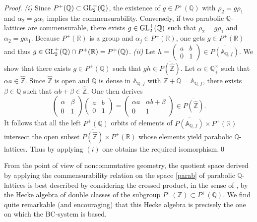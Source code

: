 \documentclass[graybox, envcountsect%
]{svmult}
\def\GL{{\rm GL}}
\def\A{{\mathbb A}}
\def\Q{{\mathbb Q}}
\def\R{{\mathbb R}}
\def\Z{{\mathbb Z}}
\begin{document}
\begin{proof} {\it (i)} Since $ P^+(\Q)\subset \GL_2^+(\Q)$, the existence of $g\in P^+(\Q)$ with $\rho_2=g\rho_1$ and $\alpha_2=g\alpha_1$ implies the commensurability. Conversely, if  two parabolic $\Q$-lattices are commensurable, there exists $g\in \GL_2^+(\Q)$ such that $\rho_2=g\rho_1$ and $\alpha_2=g\alpha_1$.	 Because $P^+(\R)$ is a group and $\alpha_j\in P^+(\R)$, one gets   
$g\in P^+(\R)$ and thus $g\in \GL_2^+(\Q)\cap P^+(\R)=P^+(\Q)$. \newline
{\it (ii)} Let $h=\begin{pmatrix} a &b \\
0 &1 \end{pmatrix}\in \overline{P(\A_{\Q,f})}$. We  show that there exists $g\in P^+(\Q)$ such that $gh\in \overline{P(\hat \Z)}$. Let $\alpha\in \Q_+^\times$ such that $\alpha a\in \hat \Z$.  Since $\hat \Z$ is open and $\Q$ is dense in $\A_{\Q,f}$ with $\hat \Z+\Q=\A_{\Q,f}$, there exists $\beta\in \Q$ such that $\alpha b+\beta\in \hat \Z$. One then derives 
$$
\begin{pmatrix} \alpha &\beta \\
0 &1 \end{pmatrix}\begin{pmatrix} a &b \\
0 &1 \end{pmatrix}= \begin{pmatrix} \alpha a &\alpha b +\beta\\
0 &1 \end{pmatrix}\in \overline{P(\hat \Z)}.
$$
It follows that all the left $P^+(\Q)$ orbits of elements of $\overline{P(\A_{\Q,f})}\times P^+(\R)$ intersect the open subset $\overline{P(\hat \Z)}\times P^+(\R)$ whose elements yield parabolic $\Q$-lattices. Thus by applying $(i)$ one obtains the required isomorphism.\qed
\end{proof}

\begin{rem}\label{bcremark} From the point of view of noncommutative geometry, the quotient space 
derived by applying the commensurability relation on the space \eqref{parab} of parabolic $\Q$-lattices is best described by considering the crossed product, in the sense of \cite{Neshveyev},  by the Hecke algebra of double classes of the subgroup $P^+(\Z)\subset P^+(\Q)$. We find quite remarkable (and encouraging) that this Hecke algebra is precisely the one on which the BC-system is based. 	
\end{rem}
 
\end{document}

